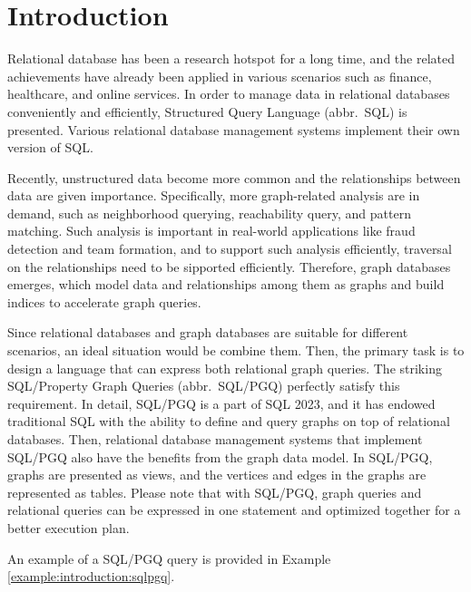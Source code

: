 \section{Introduction}

Relational database has been a research hotspot for a long time, and the related achievements have already been applied in various scenarios such as finance, healthcare, and online services.
In order to manage data in relational databases conveniently and efficiently, Structured Query Language (abbr.~SQL) is presented.
Various relational database management systems implement their own version of SQL.

Recently, unstructured data become more common and the relationships between data are given importance.
Specifically, more graph-related analysis are in demand, such as neighborhood querying, reachability query, and pattern matching.
Such analysis is important in real-world applications like fraud detection and team formation, and to support such analysis efficiently, traversal on the relationships need to be sipported efficiently.
Therefore, graph databases emerges, which model data and relationships among them as graphs and build indices to accelerate graph queries.

Since relational databases and graph databases are suitable for different scenarios, an ideal situation would be combine them.
Then, the primary task is to design a language that can express both relational graph queries.
The striking SQL/Property Graph Queries (abbr.~SQL/PGQ) perfectly satisfy this requirement.
In detail, SQL/PGQ is a part of SQL 2023, and it has endowed traditional SQL with the ability to define and query graphs on top of relational databases.
Then, relational database management systems that implement SQL/PGQ also have the benefits from the graph data model.
In SQL/PGQ, graphs are presented as views, and the vertices and edges in the graphs are represented as tables.
Please note that with SQL/PGQ, graph queries and relational queries can be expressed in one statement and optimized together for a better execution plan.

An example of a SQL/PGQ query is provided in Example \ref{example:introduction:sqlpgq}.

